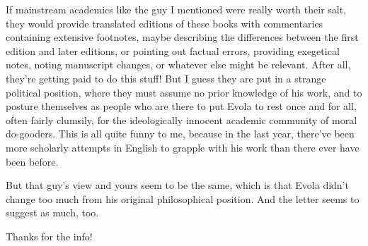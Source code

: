 \begin{footnotesize}
\begin{sffamily}
If mainstream academics like the guy I mentioned were really worth their salt, they would provide translated editions of these books with commentaries containing extensive footnotes, maybe describing the differences between the first edition and later editions, or pointing out factual errors, providing exegetical notes, noting manuscript changes, or whatever else might be relevant. After all, they're getting paid to do this stuff! But I guess they are put in a strange political position, where they must assume no prior knowledge of his work, and to posture themselves as people who are there to put Evola to rest once and for all, often fairly clumsily, for the ideologically innocent academic community of moral do-gooders. This is all quite funny to me, because in the last year, there've been more scholarly attempts in English to grapple with his work than there ever have been before.

But that guy's view and yours seem to be the same, which is that Evola didn't change too much from his original philosophical position. And the letter seems to suggest as much, too.

Thanks for the info!


\end{sffamily}\end{footnotesize}
